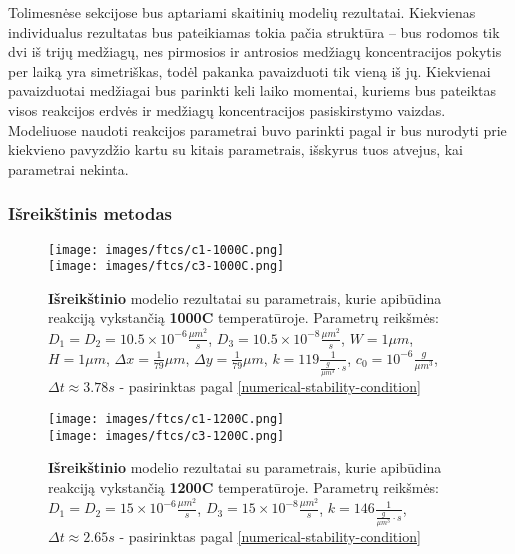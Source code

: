Tolimesnėse sekcijose bus aptariami skaitinių modelių rezultatai. Kiekvienas individualus rezultatas bus pateikiamas tokia pačia struktūra -- bus rodomos tik dvi iš trijų medžiagų, nes pirmosios ir antrosios medžiagų koncentracijos pokytis per laiką yra simetriškas, todėl pakanka pavaizduoti tik vieną iš jų. Kiekvienai pavaizduotai medžiagai bus parinkti keli laiko momentai, kuriems bus pateiktas visos reakcijos erdvės ir medžiagų koncentracijos pasiskirstymo vaizdas. Modeliuose naudoti reakcijos parametrai buvo parinkti pagal \cite{mackeviciusCloserLookComputer2012} ir bus nurodyti prie kiekvieno pavyzdžio kartu su kitais parametrais, išskyrus tuos atvejus, kai parametrai nekinta.

\newpage

\subsubsection{Išreikštinis metodas}

\begin{figure}[h!]
  \centering
  \texttt{[image: images/ftcs/c1-1000C.png]} \\ 
  \texttt{[image: images/ftcs/c3-1000C.png]}
  \caption{\textbf{Išreikštinio} modelio rezultatai su parametrais, kurie apibūdina reakciją vykstančią \textbf{1000\degree C} temperatūroje. Parametrų reikšmės: $D_1 = D_2 = 10.5\times 10^{-6} \frac{\mu m^2}{s}$, $D_3 = 10.5\times 10^{-8} \frac{\mu m^2}{s}$, $W = 1\mu m$, $H = 1\mu m$, $\Delta x = \frac{1}{79}\mu m$, $\Delta y = \frac{1}{79} \mu m$, $k = 119 \frac{1}{ \frac{g}{\mu m^3}\cdot s}$, $c_0 = 10^{-6} \frac{g}{\mu m^3}$, $\Delta t \approx 3.78s$ - pasirinktas pagal \eqref{numerical-stability-condition} }
  \label{fig:ftcs-result-T-1000}
\end{figure}

\begin{figure}[h!]
  \centering
  \texttt{[image: images/ftcs/c1-1200C.png]} \\ 
  \texttt{[image: images/ftcs/c3-1200C.png]}
  \caption{\textbf{Išreikštinio} modelio rezultatai su parametrais, kurie apibūdina reakciją vykstančią \textbf{1200\degree C} temperatūroje. Parametrų reikšmės: $D_1 = D_2 = 15\times 10^{-6} \frac{\mu m^2}{s}$, $D_3 = 15\times 10^{-8} \frac{\mu m^2}{s}$, $k = 146 \frac{1}{ \frac{g}{\mu m^3}\cdot s}$, $\Delta t \approx 2.65s$ - pasirinktas pagal \eqref{numerical-stability-condition} }
  \label{fig:ftcs-result-T-1200}
\end{figure}

